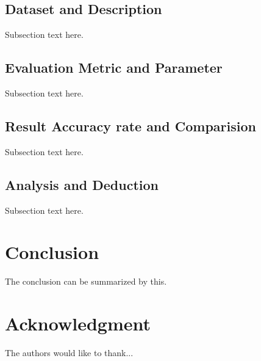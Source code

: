 \documentclass[conference]{IEEEtran}
\begin{document}
\subsection{Dataset and Description}
Subsection text here.
\subsection{Evaluation Metric and Parameter}
Subsection text here.
\subsection{Result Accuracy rate and Comparision}
Subsection text here.
\subsection{Analysis and Deduction}
Subsection text here.

\section{Conclusion}\label{S-CN}
 The conclusion can be summarized by this.

\section*{Acknowledgment}
The authors would like to thank...


\end{document}
